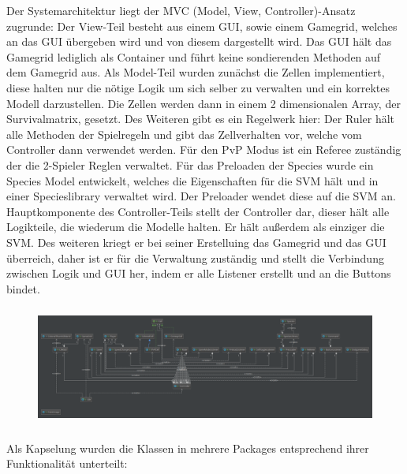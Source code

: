 \documentclass[12pt]{article}
\theoremstyle{plain}
\begin{document}
Der Systemarchitektur liegt der MVC (Model, View, Controller)-Ansatz zugrunde:
Der View-Teil besteht aus einem GUI, sowie einem Gamegrid, welches an das GUI übergeben wird und von diesem dargestellt wird.
Das GUI hält das Gamegrid lediglich als Container und führt keine sondierenden Methoden auf dem Gamegrid aus.
Als Model-Teil wurden zunächst die Zellen implementiert, diese halten nur die nötige Logik um sich selber zu verwalten und ein korrektes Modell darzustellen. Die Zellen werden dann in einem 2 dimensionalen Array, der Survivalmatrix, gesetzt. Des Weiteren gibt es ein Regelwerk hier: Der Ruler hält alle Methoden der Spielregeln und gibt das Zellverhalten vor, welche vom Controller dann verwendet werden. Für den PvP Modus ist ein Referee zuständig der die 2-Spieler Reglen verwaltet. Für das Preloaden der Species wurde ein Species Model entwickelt, welches die Eigenschaften für die SVM hält und in einer Specieslibrary verwaltet wird. Der Preloader wendet diese auf die SVM an.
Hauptkomponente des Controller-Teils stellt der Controller dar, dieser hält alle Logikteile, die wiederum die Modelle halten. Er hält außerdem als einziger die SVM.
Des weiteren kriegt er bei seiner Erstelluing das Gamegrid und das GUI überreich, daher ist er für die Verwaltung zuständig und stellt die Verbindung zwischen Logik und GUI her, indem er alle Listener erstellt und an die Buttons bindet.
\begin{figure}[ht]
\centering
\includegraphics[width=1\textwidth, height=150px]{images/gogolClasses.png}
\end{figure}
Als Kapselung wurden die Klassen in mehrere Packages entsprechend ihrer Funktionalität unterteilt:
\end{document}
